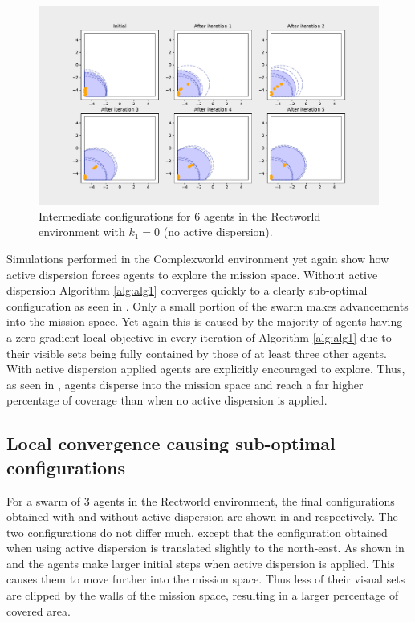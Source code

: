 \begin{figure}[H]
  \centering
  \includegraphics[width=\textwidth]{figs/bigworld_6_agnt_k_1_0_k_2_1_x_traj.pdf}
  \caption{Intermediate configurations for 6 agents in the Rectworld environment with $k_{1} = 0$ (no active dispersion).}
  \label{fig:bw_x_traj}
\end{figure}

Simulations performed in the Complexworld environment yet again show how active dispersion forces agents to explore the mission space. Without active dispersion Algorithm \ref{alg:alg1} converges quickly to a clearly sub-optimal
configuration as seen in . Only a small portion of the swarm makes advancements into the mission space. Yet again this is caused by the majority of agents having a zero-gradient
local objective in every iteration of Algorithm \ref{alg:alg1} due to their visible sets being fully contained by those of at least three other agents. With active dispersion applied agents are explicitly encouraged to explore. Thus, as seen in , agents disperse into the mission space and 
reach a far higher percentage of coverage than when no active dispersion is applied.

\subsection{Local convergence causing sub-optimal configurations}
For a swarm of 3 agents in the Rectworld environment, the final configurations obtained with 
and without active dispersion are shown in 
 and  respectively. The two configurations do not differ much, except that the configuration obtained when using active dispersion
is translated slightly to the north-east. As shown in  and  the agents make larger initial steps when active dispersion is applied. This
causes them to move further into the mission space. Thus less of their visual sets are clipped by the walls of the mission space, resulting in a larger percentage of covered area.


